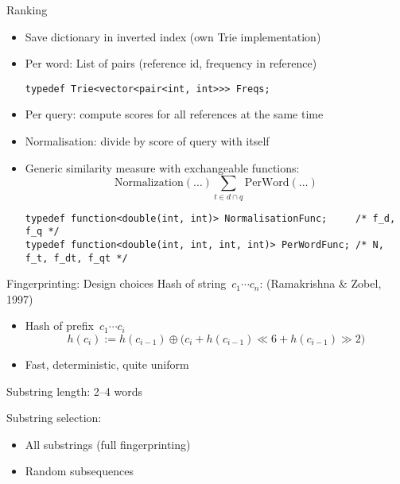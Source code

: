 \documentclass[simple]{mybeamer}
\begin{document}
\begin{frame}[fragile]{Ranking}
    \begin{itemize}
      \item Save dictionary in inverted index (own Trie implementation)
      \item Per word: List of pairs (reference id, frequency in reference)
\begin{lstlisting}
typedef Trie<vector<pair<int, int>>> Freqs;
\end{lstlisting}
      \pause
      \item Per query: compute scores for all references at the same time
      \item Normalisation: divide by score of query with itself
      \pause
      \item Generic similarity measure with exchangeable functions:
      \[
          \text{Normalization}(\dots) \sum_{t\in d\cap q} \text{PerWord}(\dots)
      \]
\begin{lstlisting}
typedef function<double(int, int)> NormalisationFunc;     /* f_d, f_q */ 
typedef function<double(int, int, int, int)> PerWordFunc; /* N, f_t, f_dt, f_qt */      
\end{lstlisting}
    \end{itemize}
\end{frame}

\begin{frame}{Fingerprinting: Design choices}
  Hash of string~$c_1\dotsb c_n$: (Ramakrishna \& Zobel, 1997)
  \begin{itemize}
    \item Hash of prefix~$c_1\dotsb c_i$
       \[ h(c_i) := h(c_{i-1}) \oplus \bigl(c_i + h(c_{i - 1}) \ll 6 + h(c_{i-1}) \gg 2\bigr) \]
    \item Fast, deterministic, quite uniform
  \end{itemize}\vspace{1\baselineskip}
  
  \pause
  
  Substring length: 2--4 words\\[1\baselineskip]
  
  \pause
  
  Substring selection:
  \begin{itemize}
    \item All substrings (full fingerprinting)
    \item Random subsequences
  \end{itemize}
\end{frame}
\end{document}
